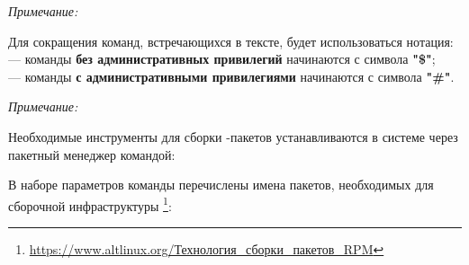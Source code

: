 \noindent 
\begin{minipage}[b]{0.25\textwidth}
	\vspace{1cm}
	\textit{Примечание:}
\end{minipage}
\hspace{0.05\textwidth}
\begin{minipage}{0.7\textwidth}
	Для сокращения команд, встречающихся в тексте, будет использоваться нотация:\\
		--- команды \textbf{без административных привилегий} начинаются с символа \textbf{"\$"};\\
		--- команды \textbf{с административными привилегиями} начинаются с символа \textbf{"\#"}.
\end{minipage}
\vspace{0.6cm}

\noindent 
\begin{minipage}[b]{0.25\textwidth}
	\vspace{1cm}
	\textit{Примечание:}
\end{minipage}
\hspace{0.05\textwidth}
\begin{minipage}{0.7\textwidth}
	Необходимые инструменты для сборки -пакетов устанавливаются в системе через пакетный менеджер  командой:\\
\end{minipage}
\vspace{0.6cm}

В наборе параметров команды  перечислены имена пакетов, необходимых для сборочной инфраструктуры \footnote{\href{https://www.altlinux.org/Технология_сборки_пакетов_RPM}{https://www.altlinux.org/Технология\_сборки\_пакетов\_RPM}}:

